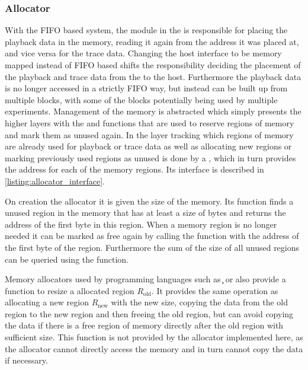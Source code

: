 \subsubsection{Allocator}
With the FIFO based system, the \vfifo{} module in the \FPGA{} is responsible for placing the playback data in the \DDR{} memory, reading it again from the address it was placed at, and vice versa for the trace data.
Changing the host interface to be memory mapped instead of FIFO based shifts the responsibility deciding the placement of the playback and trace data from the \FPGA{} to the host.
Furthermore the playback data is no longer accessed in a strictly FIFO way, but instead can be built up from multiple blocks, with some of the blocks potentially being used by multiple experiments.
Management of the \DDR{} memory is abstracted \ayo{} which simply presents the higher layers with the  and  functions that are used to reserve regions of memory and mark them as unused again.
In the \ayo{} layer tracking which regions of memory are already used for playback or trace data as well as allocating new regions or marking previously used regions as unused is done by a \allocator{}, which in turn provides the address for each of the memory regions. Its interface is described in \autoref{listing:allocator_interface}.

On creation the allocator it is given the size of the \DDR{} memory. Its  function finds a unused region in the memory that has at least a size of  bytes and returns the address of the first byte in this region.
When a memory region is no longer needed it can be marked as free again by calling the  function with the address of the first byte of the region.
Furthermore the sum of the size of all unused regions can be queried using the  function.

Memory allocators used by programming languages such as \c{} or \cpp{} also provide a function to resize a allocated region $R_{\text{old}}$. It provides the same operation as allocating a new region $R_{\text{new}}$ with the new size, copying the data from the old region to the new region and then freeing the old region, but can avoid copying the data if there is a free region of memory directly after the old region with sufficient size.
This function is not provided by the allocator implemented here, as the allocator cannot directly access the memory and in turn cannot copy the data if necessary.

